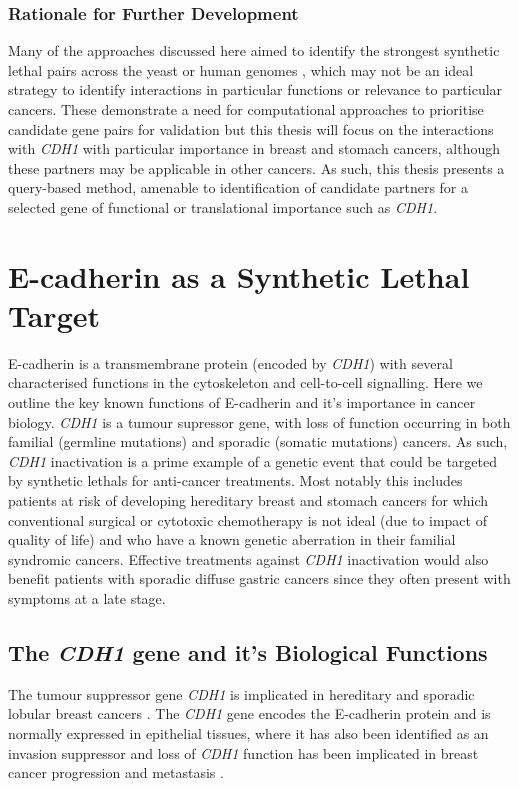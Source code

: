 \subsubsection{Rationale for Further Development}

Many of the approaches discussed here aimed to identify the strongest \gls{synthetic lethal} pairs across the yeast or human genomes \citep{Lu2015, Wappett2016, Deshpande2013, Wu2014}, which may not be an ideal strategy to identify interactions in particular functions or relevance to particular cancers. These demonstrate a need for computational approaches to prioritise candidate gene pairs for validation but this thesis will focus on the interactions with \textit{CDH1} with particular importance in breast and stomach cancers, although these partners may be applicable in other cancers. As such, this thesis presents a query-based method, amenable to identification of candidate partners for a selected gene of functional or translational importance such as \textit{CDH1}.


\section{E-cadherin as a Synthetic Lethal Target}

\gls{E-cadherin} is a transmembrane protein (encoded by \textit{CDH1}) with several characterised functions in the cytoskeleton and cell-to-cell signalling. Here we outline the key known functions of \gls{E-cadherin} and it's importance in cancer biology. \textit{CDH1} is a tumour supressor gene, with loss of function occurring in both familial (germline mutations) and sporadic (somatic mutations) cancers. As such, \textit{CDH1} inactivation is a prime example of a genetic event that could be targeted by \glspl{synthetic lethal} for anti-cancer treatments. Most notably this includes patients at risk of developing hereditary breast and stomach cancers for which conventional surgical or cytotoxic chemotherapy is not ideal (due to impact of quality of life) and who have a known genetic aberration in their familial syndromic cancers. Effective treatments against \textit{CDH1} inactivation would also benefit patients with sporadic diffuse gastric cancers since they often present with symptoms at a late stage.

\subsection{The \textit{CDH1} gene and it's Biological Functions}
The tumour suppressor gene \textit{CDH1} is implicated in hereditary and sporadic lobular breast cancers \citep{Berx1996,DeLeeuw1997,Berx2009,Vos1997,Semb1998,Masciari2007}. The \textit{CDH1} gene encodes the \gls{E-cadherin} protein and is normally expressed in epithelial tissues, where it has also been identified as an invasion suppressor and loss of \textit{CDH1} function has been implicated in breast cancer progression and metastasis \citep{Berx1995,Becker1994,Christofori1999}.

